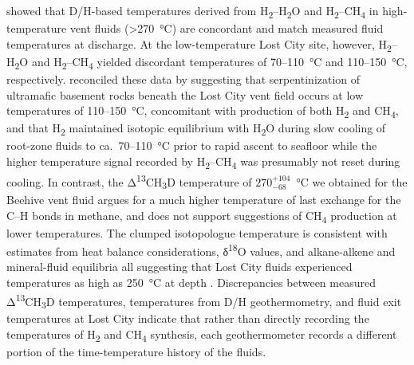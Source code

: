 \textcite{Proskurowski++_2006_CG} showed that D/H-based temperatures derived
from H\textsubscript{2}--H\textsubscript{2}O and
H\textsubscript{2}--CH\textsubscript{4} in high-temperature vent fluids
(\textgreater{}270~°C) are concordant and match measured fluid
temperatures at discharge. At the low-temperature Lost City site,
however, H\textsubscript{2}--H\textsubscript{2}O and  
H\textsubscript{2}--CH\textsubscript{4} yielded discordant temperatures
of 70--110~°C and 110--150~°C, respectively. \textcite{Proskurowski++_2006_CG}
reconciled these data by suggesting that serpentinization of ultramafic
basement rocks beneath the Lost City vent field occurs at low
temperatures of 110--150~°C, concomitant with production of both
H\textsubscript{2} and CH\textsubscript{4}, and that H\textsubscript{2}
maintained isotopic equilibrium with H\textsubscript{2}O during slow
cooling of root-zone fluids to ca.\ 70--110~°C prior to rapid ascent to
seafloor while the higher temperature signal recorded by
H\textsubscript{2}--CH\textsubscript{4} was presumably not reset during
cooling. In contrast, the Δ\textsuperscript{13}CH\textsubscript{3}D
temperature of \(270_{- 68}^{+ 104}\)~°C we obtained for the Beehive
vent fluid argues for a much higher temperature of last exchange for the
C--H bonds in methane, and does not support suggestions of
CH\textsubscript{4} production at lower temperatures. The clumped
isotopologue temperature is consistent with estimates from heat balance
considerations, δ\textsuperscript{18}O values, and alkane-alkene and
mineral-fluid equilibria all suggesting that Lost City fluids
experienced temperatures as high as 250~°C at depth \parencite{Allen+Seyfried_2004_GCA,Foustoukos++_2008_GCA,Reeves++_2012_GCA,Seyfried++_2015_GCA}. Discrepancies between measured
Δ\textsuperscript{13}CH\textsubscript{3}D temperatures, temperatures
from D/H geothermometry, and fluid exit temperatures at Lost City
indicate that rather than directly recording the temperatures of
H\textsubscript{2} and CH\textsubscript{4} synthesis, each
geothermometer records a different portion of the time-temperature
history of the fluids.

 


